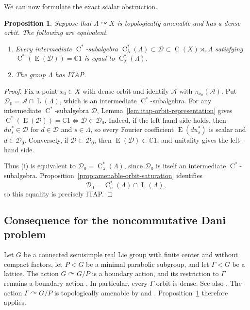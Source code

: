 \documentclass[11pt]{amsart}
\numberwithin{equation}{section}
\newcommand{\C}{\mathbb{C}}
\newcommand{\rL}{\operatorname{L}}
\newcommand{\rC}{\operatorname{C}}
\newcommand{\rE}{\operatorname{E}}
\newtheorem{proposition}[theorem]{Proposition}
\theoremstyle{definition}
\begin{document}
	We can now formulate the exact scalar obstruction.
	
	\begin{proposition}\label{prop:scalar-itap-equivalence}
		Suppose that \(\Lambda\curvearrowright X\) is topologically amenable and has a dense orbit. The following are equivalent.
		\begin{enumerate}[\rm (i)]
			\item Every intermediate \(\rC^*\)-subalgebra \(\rC^*_{\lambda}(\Lambda)\subset\mathcal D\subset\rC(X)\rtimes_r\Lambda\) satisfying \(\rC^*(\rE(\mathcal D))=\C1\) is equal to \(\rC^*_{\lambda}(\Lambda)\).
			\item The group \(\Lambda\) has {\rm ITAP}.
		\end{enumerate}
	\end{proposition}
	
	\begin{proof}
		Fix a point \(x_0\in X\) with dense orbit and identify \(\mathcal A\) with \(\pi_{x_0}(\mathcal A)\).
		Put \(\mathcal D_0=\mathcal A\cap\rL(\Lambda)\), which is an intermediate \(\rC^*\)-subalgebra. For any intermediate \(\rC^*\)-subalgebra \(\mathcal D\), Lemma~\ref{lem:itap-orbit-representation} gives \(\rC^*(\rE(\mathcal D))=\C1\Longleftrightarrow\mathcal D\subset\mathcal D_0\).
		Indeed, if the left-hand side holds, then \(du_s^*\in\mathcal D\) for \(d\in\mathcal D\) and \(s\in\Lambda\), so every Fourier coefficient \(\rE(du_s^*)\) is scalar and \(d\in\mathcal D_0\). Conversely, if \(\mathcal D\subset\mathcal D_0\), then \(\rE(\mathcal D)\subset\C1\), and unitality gives the left-hand side.
		
		Thus (i) is equivalent to \(\mathcal D_0=\rC^*_{\lambda}(\Lambda)\), since \(\mathcal D_0\) is itself an intermediate \(\rC^*\)-subalgebra. Proposition~\ref{prop:amenable-orbit-saturation} identifies
		\[
		\mathcal D_0
		=
		\rC_u^*(\Lambda)\cap\rL(\Lambda),
		\]
		so this equality is precisely {\rm ITAP}.
	\end{proof}
	
	\subsection{Consequence for the noncommutative Dani problem}
	
	Let \(G\) be a connected semisimple real Lie group with finite center and
	without compact factors, let \(P<G\) be a minimal parabolic subgroup, and let
	\(\Gamma<G\) be a lattice. The action \(G\curvearrowright G/P\) is a boundary
	action, and its restriction to \(\Gamma\) remains a boundary action
	\cite[p.~175, items~(5)--(6)]{Fu03}. In particular, every \(\Gamma\)-orbit is
	dense. See also \cite[Lemma~8.5]{Mo73}. The action
	\(\Gamma\curvearrowright G/P\) is topologically amenable by
	\cite[Theorem~6.6]{Ka05} and \cite[Theorem~5.4.1]{BO08}.
	Proposition~\ref{prop:scalar-itap-equivalence} therefore applies.
	
\end{document}
